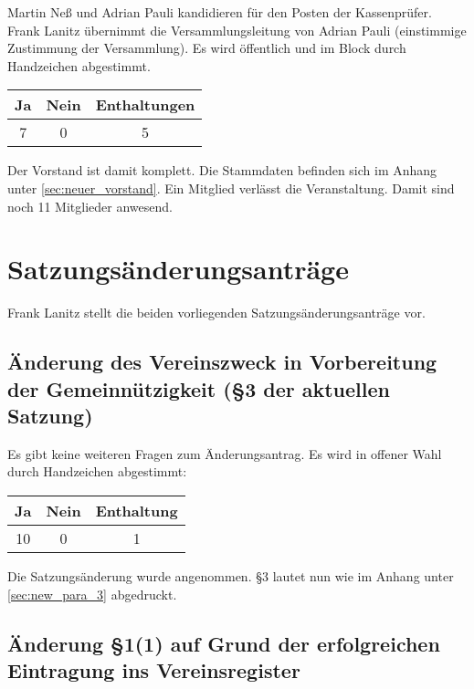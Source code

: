 \documentclass{scrartcl}
\begin{document}
Martin Neß und Adrian Pauli kandidieren für den Posten der 
Kassenprüfer. Frank Lanitz übernimmt die Versammlungsleitung von 
Adrian Pauli (einstimmige Zustimmung der Versammlung). Es wird 
öffentlich und im Block durch Handzeichen abgestimmt.

\begin{table}[h!]
    \centering
    \begin{tabular}{c|c|c}
        \textbf{Ja}& \textbf{Nein} & \textbf{Enthaltungen} \\ \hline
        7 & 0 & 5
    \end{tabular}
\end{table}

Der Vorstand ist damit komplett. Die Stammdaten befinden sich im Anhang unter \ref{sec:neuer_vorstand}.
Ein Mitglied verlässt die Veranstaltung. Damit sind noch 11 Mitglieder anwesend.

\section{Satzungsänderungsanträge}
Frank Lanitz stellt die beiden vorliegenden Satzungsänderungsanträge
vor.

\subsection{Änderung des Vereinszweck in Vorbereitung der
Gemeinnützigkeit (§3 der aktuellen Satzung)}

Es gibt keine weiteren Fragen zum Änderungsantrag. Es wird in offener
Wahl durch Handzeichen abgestimmt:

\begin{table}[h!]
    \centering
    \begin{tabular}{c|c|c}
        \textbf{Ja} & \textbf{Nein} & \textbf{Enthaltung} \\ \hline
        10 & 0 & 1
    \end{tabular}
\end{table}

Die Satzungsänderung wurde angenommen. §3 lautet nun wie im Anhang unter
\ref{sec:new_para_3} abgedruckt.

\subsection{Änderung §1(1) auf Grund der erfolgreichen Eintragung ins
Vereinsregister}
\end{document}
